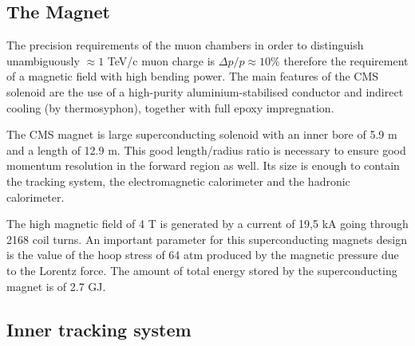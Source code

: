 \clearpage

\subsection{The Magnet}

The precision requirements of the muon chambers in order to distinguish unambiguously $\approx 1$ TeV/c muon charge is $\Delta p / p \approx 10\%$ therefore the requirement of a magnetic field with high bending power. The main features of the CMS solenoid are the use of a high-purity aluminium-stabilised conductor and indirect cooling (by thermosyphon), together with full epoxy impregnation.

The CMS magnet is large superconducting solenoid with an inner bore of 5.9 m and a length of 12.9 m.  This good length/radius ratio is necessary to ensure good momentum resolution in the forward region as well. Its size is enough to contain the tracking system, the electromagnetic calorimeter and the hadronic calorimeter. 

The high magnetic field of 4 T is generated by a current of 19,5 kA going through 2168 coil turns. An important parameter for this superconducting magnets design is the value of the hoop stress of 64 atm produced by the magnetic pressure due to the Lorentz force. The amount of total energy stored by the superconducting magnet is of 2.7 GJ.

		

\clearpage

\subsection{Inner tracking system}

